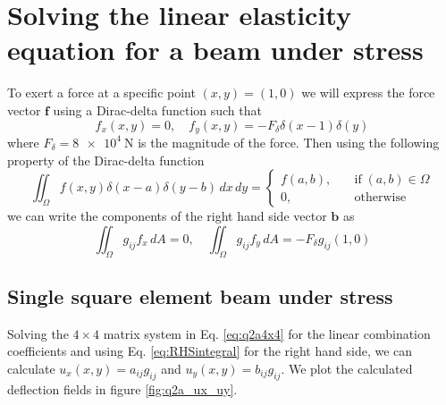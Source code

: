 \documentclass[11pt]{article}
\begin{document}
\section{Solving the linear elasticity equation for a beam under stress}
To exert a force at a specific point $(x,y) = (1,0)$ we will express the force vector $\bm{f}$ using a Dirac-delta function such that
\begin{equation}
  f_x(x,y) = 0, \quad f_y(x,y) = -F_\delta \delta(x-1)\delta(y)
\end{equation}
where $F_\delta = \SI{8e4}{\N}$ is the magnitude of the force. Then using the following property of the Dirac-delta function
\begin{equation}
  \iint_\Omega f(x,y) \delta(x-a) \delta(y-b) \, dx \, dy =
  \begin{cases}
  	f(a,b), \quad &\mathrm{if} \; (a,b) \in \Omega \\
  	0, \quad &\mathrm{otherwise}
  \end{cases}
\end{equation}
we can write the components of the right hand side vector $\bm{b}$ as
\begin{equation} \label{eq:RHSintegral}
  \iint_\Omega g_{ij} f_x \, dA = 0, \quad 
  \iint_\Omega g_{ij} f_y \, dA = -F_\delta g_{ij}(1,0)
\end{equation}

\subsection{Single square element beam under stress}
Solving the $4\times4$ matrix system in Eq. \eqref{eq:q2a4x4} for the linear combination coefficients and using Eq. \eqref{eq:RHSintegral} for the right hand side, we can calculate $u_x(x,y) = a_{ij}g_{ij}$ and $u_y(x,y) = b_{ij}g_{ij}$. We plot the calculated deflection fields in figure \ref{fig:q2a_ux_uy}.
\end{document}
